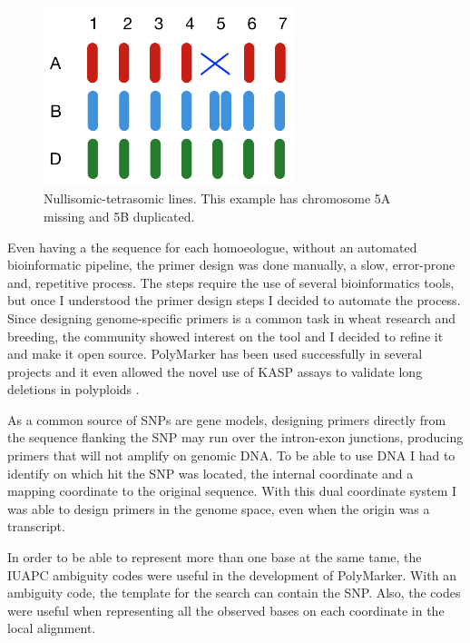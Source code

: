 \begin{figure}
\includegraphics[width=0.65\textwidth]{PolyMarker/Figures/disc/NulliTera.pdf}
\caption[Nullisomic-tetrasomic lines]{ Nullisomic-tetrasomic lines. This example has chromosome 5A missing and 5B duplicated. }
\label{fig:poly:nullitetra}
\end{figure}

Even having a the sequence for each homoeologue, without an automated bioinformatic pipeline, the primer design was done manually, a slow, error-prone and, repetitive process. 
The steps require the use of several bioinformatics tools, but once I understood the primer design steps I decided to automate the process. 
Since designing genome-specific primers is a common task in wheat research and breeding, the community showed interest on the tool and I decided to refine it and make it open source. 
PolyMarker has been used successfully in several projects \citep{Ramirez-Gonzalez2015b,Hubbard2015,Burt2015,King2015,Sollars2016} and it even allowed the novel use of KASP assays to validate long deletions in polyploids \citep{Krasileva2016}. 
 
As a common source of SNPs are gene models, designing primers directly from the sequence flanking the SNP may run over the intron-exon junctions, producing primers that will not amplify on genomic DNA. 
To be able to use DNA I had to identify on which hit the SNP was located, the internal coordinate and a mapping coordinate to the original sequence. 
With this dual coordinate system I was able to design primers in the genome space, even when the origin was a transcript. 

In order to be able to represent more than one base at the same tame, the IUAPC ambiguity codes \citep{Cornish-Bowden1985} were useful in the development of PolyMarker. 
With an ambiguity code, the template for the search can contain the SNP. 
Also, the codes were useful when representing all the observed bases on each coordinate in the local alignment. 

